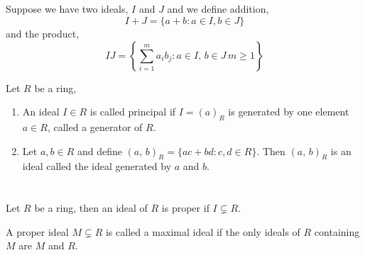 \documentclass{article}
\begin{document}
\subsection[Construction of the quotient ring]{}

\begin{ndefi}
  Suppose we have two ideals, $I$ and $J$ and we define addition,
  $$ I + J = \{ a + b : a \in I, b \in J\} $$
  and the product,
  $$ IJ = \left\{\sum_{i=1}^m a_ib_j : a \in I,\,b\in J\, m \ge 1 \right\} $$
\end{ndefi}

\begin{ndefi}
  Let $R$ be a ring,
  \begin{enumerate}
    \item An ideal $I \in R$ is called principal if $I = (a)_R$ is generated by one element $a \in R$, called a generator of $R$.
    \item Let $a, b \in R$ and define $(a,\,b)_R = \{ac + bd : c, d \in R\}$. Then $(a,\,b)_R$ is an ideal called the ideal generated by $a$ and $b$.
  \end{enumerate}
\end{ndefi}

\section[Prime and Maximal Ideals]{}

\subsection[Maximal Ideals]{}

\begin{ndefi}
  Let $R$ be a ring, then an ideal of $R$ is proper if $I \subsetneq R$.
\end{ndefi}

\begin{ndefi}
  A proper ideal $M \subsetneq R$ is called a maximal ideal if the only ideals of $R$ containing $M$ are $M$ and $R$.
\end{ndefi}

\subsection[Prime Ideals]{}
\end{document}
